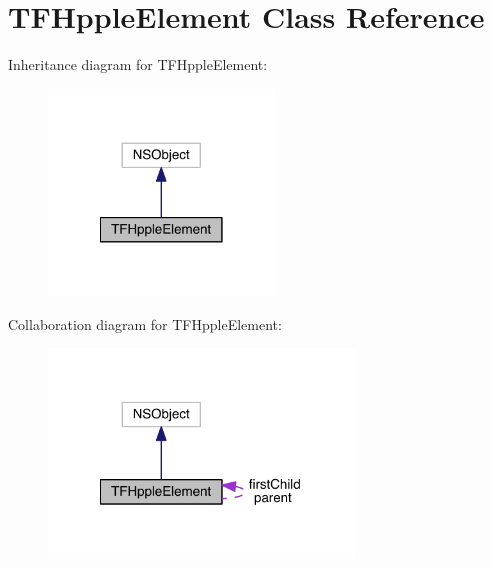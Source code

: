 \section{T\+F\+Hpple\+Element Class Reference}
\label{interface_t_f_hpple_element}


Inheritance diagram for T\+F\+Hpple\+Element\+:
\nopagebreak
\begin{figure}[H]
\begin{center}
\leavevmode
\includegraphics[width=170pt]{interface_t_f_hpple_element__inherit__graph}
\end{center}
\end{figure}


Collaboration diagram for T\+F\+Hpple\+Element\+:
\nopagebreak
\begin{figure}[H]
\begin{center}
\leavevmode
\includegraphics[width=230pt]{interface_t_f_hpple_element__coll__graph}
\end{center}
\end{figure}
